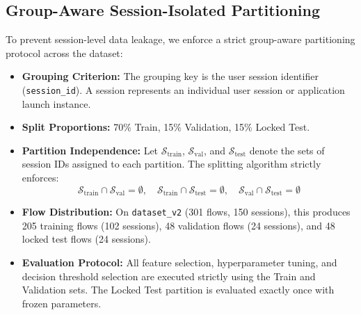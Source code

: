 \documentclass[conference]{IEEEtran}
\begin{document}
\subsection{Group-Aware Session-Isolated Partitioning}
To prevent session-level data leakage, we enforce a strict group-aware partitioning protocol across the dataset:
\begin{itemize}
    \item \textbf{Grouping Criterion:} The grouping key is the user session identifier (\texttt{session\_id}). A session represents an individual user session or application launch instance.
    \item \textbf{Split Proportions:} 70\% Train, 15\% Validation, 15\% Locked Test.
    \item \textbf{Partition Independence:} Let $\mathcal{S}_{\text{train}}$, $\mathcal{S}_{\text{val}}$, and $\mathcal{S}_{\text{test}}$ denote the sets of session IDs assigned to each partition. The splitting algorithm strictly enforces:
    \begin{equation}
        \mathcal{S}_{\text{train}} \cap \mathcal{S}_{\text{val}} = \emptyset, \quad \mathcal{S}_{\text{train}} \cap \mathcal{S}_{\text{test}} = \emptyset, \quad \mathcal{S}_{\text{val}} \cap \mathcal{S}_{\text{test}} = \emptyset
    \end{equation}
    \item \textbf{Flow Distribution:} On \texttt{dataset\_v2} (301 flows, 150 sessions), this produces 205 training flows (102 sessions), 48 validation flows (24 sessions), and 48 locked test flows (24 sessions).
    \item \textbf{Evaluation Protocol:} All feature selection, hyperparameter tuning, and decision threshold selection are executed strictly using the Train and Validation sets. The Locked Test partition is evaluated exactly once with frozen parameters.
\end{itemize}
\end{document}
